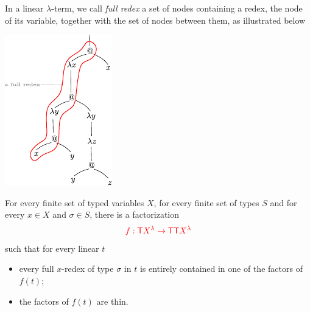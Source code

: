 In a linear $\lambda$-term, we call \emph{full redex} a set of nodes  containing a redex, the node of its variable, together with the set of nodes between them, as illustrated below
\begin{center}
\includegraphics[scale=1.5]{full-redex.pdf}
\end{center}


\begin{proposition}\label{prop:FactoIntoThin} For every finite set of typed variables $X$, for every finite set of types $S$ and for every $x\in X$ and $\sigma\in S$, there is a factorization $${\color{red}{f:{\color{red}{\mathsf T}}{\color{red}{X^\lambda}} \to {\color{red}{\mathsf T}}{\color{red}{\mathsf T}}{\color{red}{X^\lambda}}}}$$ 
such that for every linear \lambdaterm $t$
\begin{itemize}
\item every full $x$-redex of type $\sigma$ in $t$ is entirely contained in one of the factors of $f(t)$;
\item the factors of $f(t)$ are thin.
\end{itemize}
\end{proposition}

